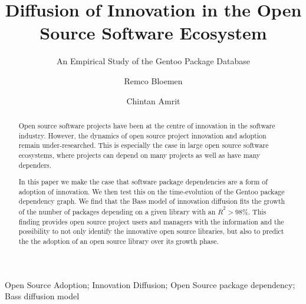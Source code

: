 \documentclass[smallextended,final]{svjour3}
\begin{document}
\title{Diffusion of Innovation in the Open Source Software Ecosystem}
\subtitle{An Empirical Study of the Gentoo Package Database} 
\dedication{}
\author{Remco Bloemen \and Chintan Amrit}

\maketitle


\begin{abstract}
Open source software projects have been at the centre of innovation in the software industry. However, the dynamics of open source project innovation and adoption remain under-researched. This is especially the case in large open source software ecosystems, where projects can depend on many projects as well as have many dependers. 

In this paper we make the case that software package dependencies are a form of  adoption of innovation. We then test this on the time-evolution of the Gentoo package dependency graph. We find that the Bass model of innovation diffusion fits the growth of the number of packages depending on a given library with an $\overline{R}^2 > 98\%$. This finding provides open source project users and managers with the information and the possibility to not only identify the innovative open source libraries, but also to predict the the adoption of an open source library over its growth phase.
\end{abstract}

\begin{keywords}{
Open Source Adoption; Innovation Diffusion; Open Source package dependency; Bass diffusion model}
\end{keywords}
\end{document}
